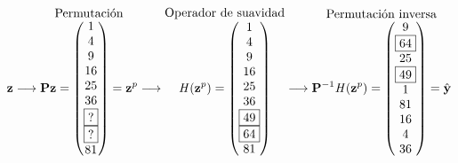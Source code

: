 \begin{figure}[H]
	\[
		\mathbf{z} \longrightarrow
		\overset{\mbox{Permutaci\'on}}{\mathbf{P}\mathbf{z} = \left(\begin{matrix}1\\4\\9\\16\\25\\36\\\boxed{?}\\\boxed{?}\\81\end{matrix}\right) = \mathbf{z}^p}
		\longrightarrow
		\overset{\mbox{Operador de suavidad}}{\mathit{H}(\mathbf{z}^p) = \left(\begin{matrix}1\\4\\9\\16\\25\\36\\\boxed{49}\\\boxed{64}\\81\end{matrix}\right)}
		\longrightarrow
		\overset{\mbox{Permutaci\'on inversa}}{ \mathbf{P}^{-1}\mathit{H}(\mathbf{z}^p) = \left(\begin{matrix}9\\\boxed{64}\\25\\\boxed{49}\\1\\81\\16\\4\\36\end{matrix}\right) = \hat{\mathbf{y}}}
	\]
	

\end{figure}
